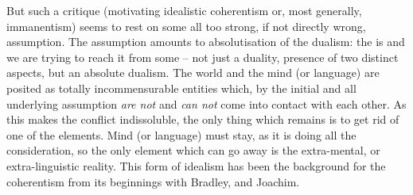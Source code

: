 But such a critique (motivating idealistic coherentism or, most generally,
immanentism) seems to rest on some all too strong, if not directly wrong,
assumption. The assumption amounts to absolutisation of the dualism: the
 is  and we are trying to reach it
from some  -- not just a duality, presence of two distinct
aspects, but an absolute dualism. The world and the mind
(or language) are posited as totally incommensurable entities which, by the
initial and all underlying assumption {\em are not} and {\em can not} come into
contact with each other. As this makes the conflict indissoluble, the only thing
which remains is to get rid of one of the elements. Mind (or language) must
stay, as it is doing all the consideration, so the only element which can go
away is the extra-mental, or extra-linguistic reality. This form of idealism has been
the background for the coherentism from its beginnings with Bradley, and
Joachim.

